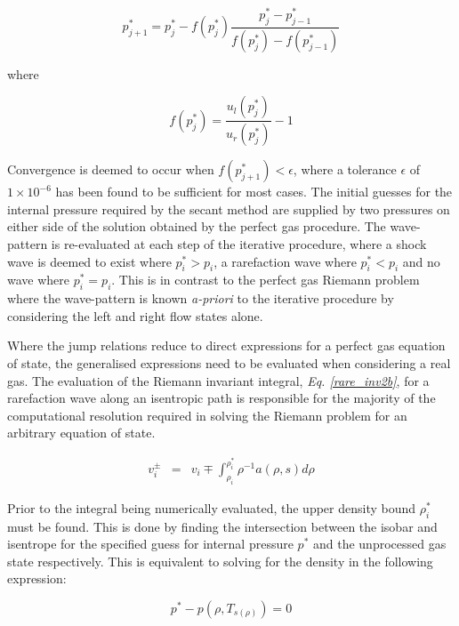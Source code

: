 \documentclass[a4paper,10pt]{article}
\begin{document}
\begin{equation}
p_{j+1}^{*} = p_{j}^{*} - f(p_{j}^{*}) \frac{p_{j}^{*} - p_{j-1}^{*}}{f(p_{j}^{*}) - f(p_{j-1}^{*})} \label{secant_method}
\end{equation}

where

\begin{equation}
f(p_{j}^{*}) = \frac{u_{l}(p_{j}^{*})}{u_{r}(p_{j}^{*})}-1 \label{f_zero}
\end{equation}

Convergence is deemed to occur when $f(p_{j+1}^{*}) < \epsilon $, where a tolerance $\epsilon$ of $1 \times 10^{-6}$ has been found to be sufficient for most cases.  The  initial guesses for the internal pressure required by the secant method are supplied by two pressures on either side of the solution obtained by the perfect gas procedure.  The wave-pattern is re-evaluated at each step of the iterative procedure, where a shock wave is deemed to exist where $ p_{i}^{*} > p_{i} $, a rarefaction wave where $ p_{i}^{*} < p_{i} $ and no wave where $ p_{i}^{*} = p_{i} $.  This is in contrast to the perfect gas Riemann problem where the wave-pattern is known \emph{a-priori} to the iterative procedure by considering the left and right flow states alone.
\par
\medskip

Where the jump relations reduce to direct expressions for a perfect gas equation of state, the generalised expressions need to be evaluated when considering a real gas.  The evaluation of the Riemann invariant integral, \emph{Eq. \ref{rare_inv2b}}, for a rarefaction wave along an isentropic path is responsible for the majority of the computational resolution required in solving the Riemann problem for an arbitrary equation of state.
\par

\begin{eqnarray}
v_{i}^{\pm} &=& v_{i} \mp \int^{\rho_{i}^{*}}_{\rho_{i}} \rho^{-1}
a ( \rho, s) d \rho \label{rare_inv2b}
\end{eqnarray}

Prior to the integral being numerically evaluated, the upper density bound $\rho_{i}^{*}$ must be found.  This is done by finding the intersection between the isobar and isentrope for the specified guess for internal pressure $p^{*}$ and the unprocessed gas state respectively.  This is equivalent to solving for the density in the following expression:

\begin{equation}
p^{*} - p (\rho,T_{s(\rho)}) = 0 \label{isos}
\end{equation}
\end{document}
